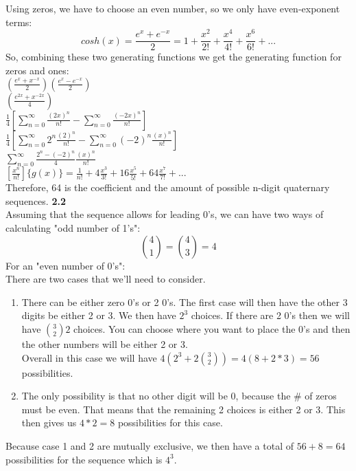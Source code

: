 \documentclass[10pt,a4paper]{report}
\begin{document}
	Using zeros, we have to choose an even number, so we only have even-exponent terms:\\
	\[cosh(x) = \frac{e^x + e^{-x}}{2} = 1 + \frac{x^2}{2!} + \frac{x^4}{4!} + \frac{x^6}{6!} + ...\]
	So, combining these two generating functions we get the generating function for zeros and ones:\\
	$(\frac{e^x + x^{-x}}{2})(\frac{e^x - e^{-x}}{2}) $\\
	$(\frac{e^{2x} + x^{-2x}}{4})$\\
	$\frac{1}{4}[\sum_{n=0}^{\infty}\frac{(2x)^n}{n!} - \sum_{n=0}^{\infty}\frac{(-2x)^n}{n!}]$\\
	$\frac{1}{4}[\sum_{n=0}^{\infty}2^n\frac{(2)^n}{n!} - \sum_{n=0}^{\infty}(-2)^n\frac{(x)^n}{n!}]$\\
	$\sum_{n=0}^{\infty}\frac{2^n-(-2)^n}{4}\frac{(x)^n}{n!}$\\
	$[\frac{x^n}{n!}]\{g(x)\} = \frac{1}{n!} + 4\frac{x^3}{3!} + 16\frac{x^5}{5!} + 64\frac{x^7}{7!} + ...$\\
	Therefore, 64 is the coefficient and the amount of possible n-digit quaternary sequences. 
	\textbf{2.2}\\
	Assuming that the sequence allows for leading 0's, we can have two ways of calculating "odd number of 1's":
	\[\binom{4}{1} = \binom{4}{3} = 4\]
	For an "even number of 0's":\\
	There are two cases that we'll need to consider.
	\begin{enumerate}
		\item There can be either zero 0's or 2 0's.  The first case will then have the other 3 digits be either 2 or 3.  We then have $2^3$ choices.  If there are 2 0's then we will have $\binom{3}{2}2$ choices.  You can choose where you want to place the 0's and then the other numbers will be either 2 or 3.\\
		Overall in this case we will have $4(2^3 + 2\binom{3}{2}) = 4(8 + 2 * 3) = 56$ possibilities.
		\item The only possibility is that no other digit will be 0, because the \# of zeros must be even.  That means that the remaining 2 choices is either 2 or 3.  This then gives us $4 * 2 = 8$ possibilities for this case.\\
	\end{enumerate}
	
	Because case 1 and 2 are mutually exclusive, we then have a total of $56 + 8 = 64$ possibilities for the sequence which is $4^3$.
	
\end{document}
